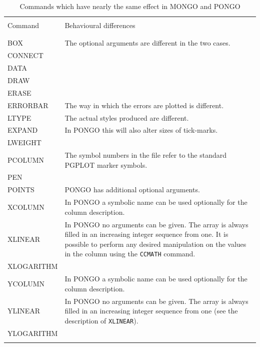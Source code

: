 \documentclass[twoside,11pt]{article}
\newcommand{\htmlref}[2]{#1}
\renewcommand{\_}{\texttt{\symbol{95}}}
\newcommand{\cnam}[1]{{\tt #1}}
\newcommand{\iref} [1]{\htmlref{#1}{#1}}
\begin{document}
{\small
\begin{table}
\begin{center}
\begin{tabular}{|l|p{}|}
\hline
& \\
Command    & Behavioural differences \\
& \\
\hline
& \\
BOX        & The optional arguments are different in the two cases. \\
CONNECT    & \\
DATA       & \\
DRAW       & \\
ERASE      & \\
ERRORBAR   & The way in which the errors are plotted is different.
\\
LTYPE      & The actual styles produced are different. \\
EXPAND     & In PONGO this will also alter sizes of tick-marks. \\
LWEIGHT    & \\
PCOLUMN    & The symbol numbers in the file refer to the standard
PGPLOT marker symbols. \\
PEN        & \\
POINTS     & PONGO has additional optional arguments. \\
XCOLUMN    & In PONGO a symbolic name can be used optionally for
the column description. \\
XLINEAR    & In PONGO no arguments can be given. The array is
always filled in an increasing integer sequence from one. It is
possible to perform any desired manipulation on the values in the
column using the \cnam{\iref{CCMATH}} command. \\
XLOGARITHM & \\
YCOLUMN    & In PONGO a symbolic name can be used optionally for
the column description. \\
YLINEAR    & In PONGO no arguments can be given. The array is
always filled in an increasing integer sequence from one (see the description
of \cnam{\iref{XLINEAR}}). \\
YLOGARITHM & \\
& \\ \hline
\end{tabular}
\end{center}
\caption{Commands which have nearly the same effect in MONGO and PONGO}
\label{mongo_same_tab}
\end{table}
}
\end{document}

